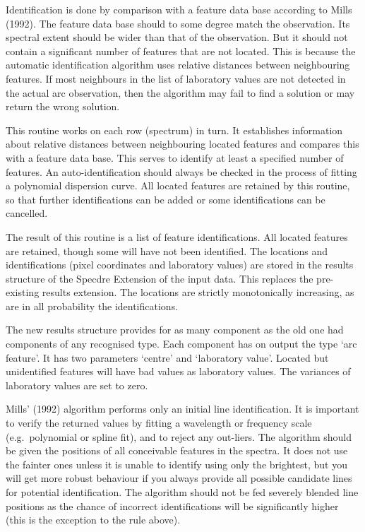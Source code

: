 {{      Identification is done by comparison with a feature data base
      according to Mills (1992). The feature data base should to some
      degree match the observation. Its spectral extent should be wider
      than that of the observation. But it should not contain a
      significant number of features that are not located. This is
      because the automatic identification algorithm uses relative
      distances between neighbouring features. If most neighbours in the
      list of laboratory values are not detected in the actual arc
      observation, then the algorithm may fail to find a solution or may
      return the wrong solution.

      This routine works on each row (spectrum) in turn. It establishes
      information about relative distances between neighbouring located
      features and compares this with a feature data base. This serves
      to identify at least a specified number of features. An
      auto-identification should always be checked in the process of
      fitting a polynomial dispersion curve. All located features are
      retained by this routine, so that further identifications can be
      added or some identifications can be cancelled.

      The result of this routine is a list of feature identifications.
      All located features are retained, though some will have not been
      identified. The locations and identifications (pixel coordinates
      and laboratory values) are stored in the results structure of the
      Specdre Extension of the input data. This replaces the
      pre-existing results extension. The locations are strictly
      monotonically increasing, as are in all probability the
      identifications.

      The new results structure provides for as many component as the
      old one had components of any recognised type. Each component has
      on output the type `arc feature'. It has two parameters `centre'
      and `laboratory value'. Located but unidentified features will
      have bad values as laboratory values. The variances of laboratory
      values are set to zero.

      Mills' (1992) algorithm performs only an initial line
      identification. It is important to verify the returned values by
      fitting a wavelength or frequency scale (e.g.\ polynomial or spline
      fit), and to reject any out-liers. The algorithm should be given
      the positions of all conceivable features in the spectra. It does
      not use the fainter ones unless it is unable to identify using
      only the brightest, but you will get more robust behaviour if you
      always provide all possible candidate lines for potential
      identification. The algorithm should not be fed severely blended
      line positions as the chance of incorrect identifications will be
      significantly higher (this is the exception to the rule above).

}}
